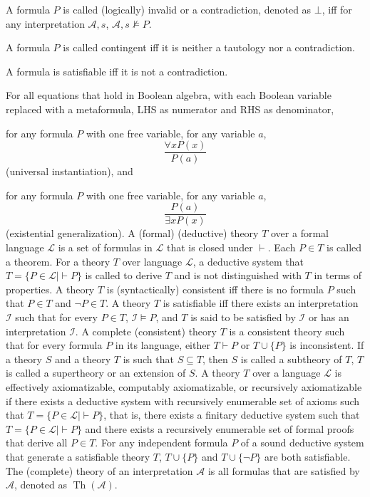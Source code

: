 \documentclass[a4paper,12pt]{article}
\begin{document}
A formula $P$ is called (logically) invalid or a contradiction, denoted as $\bot$, iff for any interpretation $\mathcal{A},s$, $\mathcal{A},s\nvDash P$.

A formula $P$ is called contingent iff it is neither a tautology nor a contradiction.

A formula is satisfiable iff it is not a contradiction.
\bit
\item For all equations that hold in Boolean algebra, with each Boolean variable replaced with a metaformula, LHS as numerator and RHS as denominator,
\item for any formula $P$ with one free variable, for any variable $a$,
\[\frac{\forall xP(x)}{P(a)}\]
(universal instantiation), and
\item for any formula $P$ with one free variable, for any variable $a$,
\[\frac{P(a)}{\exists xP(x)}\]
(existential generalization).
\eit
{}
A (formal) (deductive) theory $T$ over a formal language $\mathcal{L}$ is a set of formulas in $\mathcal{L}$ that is closed under $\vdash$. Each $P\in T$ is called a theorem.
For a theory $T$ over language $\mathcal{L}$, a deductive system that $T=\{P\in\mathcal{L}\mid\vdash P\}$ is called to derive $T$ and is not distinguished with $T$ in terms of properties.
A theory $T$ is (syntactically) consistent iff there is no formula $P$ such that $P\in T$ and $\neg P\in T$.
A theory $T$ is satisfiable iff there exists an interpretation $\mathcal{I}$ such that for every $P\in T$, $\mathcal{I}\vDash P$, and $T$ is said to be satisfied by $\mathcal{I}$ or has an interpretation $\mathcal{I}$.
A complete (consistent) theory $T$ is a consistent theory such that for every formula $P$ in its language, either $T\vdash P$ or $T\cup\{P\}$ is inconsistent.
If a theory $S$ and a theory $T$ is such that $S\subseteq T$, then $S$ is called a subtheory of $T$, $T$ is called a supertheory or an extension of $S$.
A theory $T$ over a language $\mathcal{L}$ is effectively axiomatizable, computably axiomatizable, or recursively axiomatizable if there exists a deductive system with recursively enumerable set of axioms such that $T=\{P\in\mathcal{L}\mid\vdash P\}$, that is, there exists a finitary deductive system such that $T=\{P\in\mathcal{L}\mid\vdash P\}$ and there exists a recursively enumerable set of formal proofs that derive all $P\in T$.
For any independent formula $P$ of a sound deductive system that generate a satisfiable theory $T$, $T\cup\{P\}$ and $T\cup\{\neg P\}$ are both satisfiable.
The (complete) theory of an interpretation $\mathcal{A}$ is all formulas that are satisfied by $\mathcal{A}$, denoted as $\operatorname{Th}(\mathcal{A})$.
\end{document}
